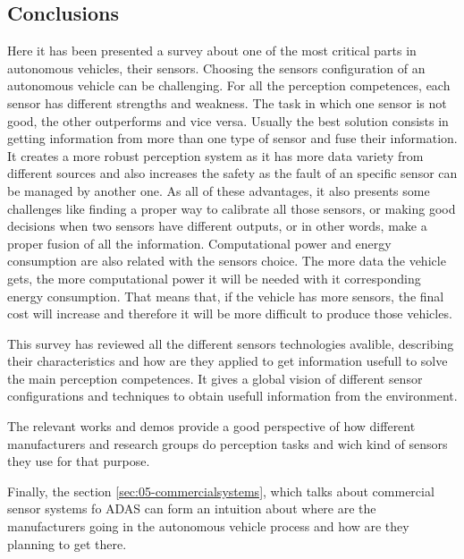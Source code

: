 \subsection{Conclusions}

Here it has been presented a survey about one of the most critical parts in autonomous vehicles, their sensors. Choosing the sensors configuration of an autonomous vehicle can be challenging. For all the perception competences, each sensor has different strengths and weakness. The task in which one sensor is not good, the other outperforms and vice versa. Usually the best solution consists in getting information from more than one type of sensor and fuse their information. It creates a more robust  perception system as it has more data variety from different sources and also increases the safety as the fault of an specific sensor can be managed by another one. As all of these advantages, it also presents some challenges like finding a proper way to calibrate all those sensors, or making good decisions when two sensors have different outputs, or in other words, make a proper fusion of all the information. Computational power and energy consumption are also related with the sensors choice. The more data the vehicle gets, the more computational power it will be needed with it corresponding energy consumption. That means that, if the vehicle has more sensors, the final cost will increase and therefore it will be more difficult  to produce those vehicles.

This survey has reviewed all the different sensors technologies avalible, describing their characteristics and how are they applied to get information usefull to solve the main perception competences. It gives a global vision of different sensor configurations and techniques to obtain usefull information from the environment.

The relevant works and demos provide a good perspective of how different manufacturers and research groups do perception tasks and wich kind of sensors they use for that purpose.

Finally, the section \ref{sec:05-commercialsystems}, which talks about commercial sensor systems fo ADAS can form an intuition about where are the manufacturers going in the autonomous vehicle process and how are they planning to get there.



